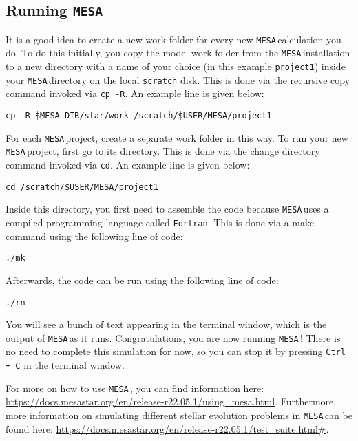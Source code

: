 \documentclass[11pt,a4paper]{article}
\newcommand{\MESA}{\texttt{MESA}\,}
\begin{document}
\subsection{Running \texttt{MESA}}

It is a good idea to create a new work folder for every new \MESA calculation you do. To do this initially, you copy the model work folder from the \MESA installation to a new directory with a name of your choice (in this example \texttt{project1}) inside your \MESA directory on the local \texttt{scratch} disk. This is done via the recursive copy command invoked via \texttt{cp -R}. An example line is given below:

\begin{lstlisting}
cp -R $MESA_DIR/star/work /scratch/$USER/MESA/project1
\end{lstlisting}

\noindent
For each \MESA project, create a separate work folder in this way. To run your new \MESA project, first go to its directory. This is done via the change directory command invoked via \texttt{cd}. An example line is given below:

\begin{lstlisting}
cd /scratch/$USER/MESA/project1
\end{lstlisting}

\noindent
Inside this directory, you first need to assemble the code because \MESA uses a compiled programming language called \texttt{Fortran}. This is done via a make command using the following line of code: 

\begin{lstlisting}
./mk
\end{lstlisting}

\noindent
Afterwards, the code can be run using the following line of code: 

\begin{lstlisting}
./rn
\end{lstlisting}

\noindent
You will see a bunch of text appearing in the terminal window, which is the output of \MESA as it runs. Congratulations, you are now running \MESA!
There is no need to complete this simulation for now, so you can stop it by pressing \texttt{Ctrl + C} in the terminal window.


\bigskip\noindent
For more on how to use \MESA, you can find information here: \url{https://docs.mesastar.org/en/release-r22.05.1/using_mesa.html}. Furthermore, more information on simulating different stellar evolution problems in \MESA can be found here: \url{https://docs.mesastar.org/en/release-r22.05.1/test_suite.html#}.
\end{document}
